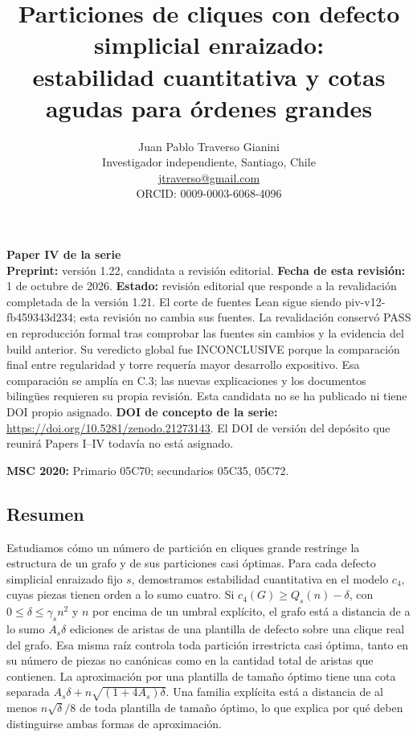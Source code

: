 \documentclass[spanish,11pt,a4paper]{article}
\title{Particiones de cliques con defecto simplicial enraizado:\\estabilidad cuantitativa y cotas agudas para órdenes grandes}
\author{Juan Pablo Traverso Gianini\\
\small Investigador independiente, Santiago, Chile\\
\small \href{mailto:jtraverso@gmail.com}{jtraverso@gmail.com}\\
\small ORCID: 0009-0003-6068-4096}
\date{}
\begin{document}
\raggedbottom
\maketitle
\textbf{Paper IV de la serie}\\
\textbf{Preprint:} versión 1.22, candidata a revisión editorial. \textbf{Fecha de esta revisión:} 1 de octubre de 2026. \textbf{Estado:} revisión editorial que responde a la revalidación completada de la versión 1.21. El corte de fuentes Lean sigue siendo {\ttfamily\small piv-\discretionary{\hbox{\ensuremath{\hookrightarrow}}}{}{}v12-\discretionary{\hbox{\ensuremath{\hookrightarrow}}}{}{}fb459343d234}; esta revisión no cambia sus fuentes. La revalidación conservó PASS en reproducción formal tras comprobar las fuentes sin cambios y la evidencia del build anterior. Su veredicto global fue INCONCLUSIVE porque la comparación final entre regularidad y torre requería mayor desarrollo expositivo. Esa comparación se amplía en C.3; las nuevas explicaciones y los documentos bilingües requieren su propia revisión. Esta candidata no se ha publicado ni tiene DOI propio asignado. \textbf{DOI de concepto de la serie:} \url{https://doi.org/10.5281/zenodo.21273143}. El DOI de versión del depósito que reunirá Papers I--IV todavía no está asignado.

\textbf{MSC 2020:} Primario 05C70; secundarios 05C35, 05C72.

\subsection{Resumen}\label{resumen}

Estudiamos cómo un número de partición en cliques grande restringe la estructura de un grafo y de sus particiones casi óptimas. Para cada defecto simplicial enraizado fijo \(s\), demostramos estabilidad cuantitativa en el modelo \(c_4\), cuyas piezas tienen orden a lo sumo cuatro. Si \(c_4(G)\ge Q_s(n)-\delta\), con \(0\le\delta\le\gamma_s n^2\) y \(n\) por encima de un umbral explícito, el grafo está a distancia de a lo sumo \(A_s\delta\) ediciones de aristas de una plantilla de defecto sobre una clique real del grafo. Esa misma raíz controla toda partición irrestricta casi óptima, tanto en su número de piezas no canónicas como en la cantidad total de aristas que contienen. La aproximación por una plantilla de tamaño óptimo tiene una cota separada \(A_s\delta+n\sqrt{(1+4A_s)\delta}\). Una familia explícita está a distancia de al menos \(n\sqrt{\delta}/8\) de toda plantilla de tamaño óptimo, lo que explica por qué deben distinguirse ambas formas de aproximación.
\end{document}
